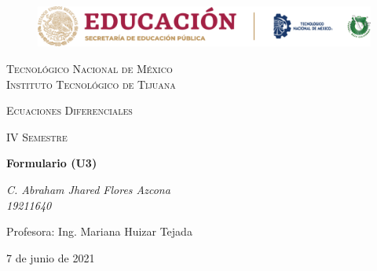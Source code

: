 \documentclass[letterpaper, 12pt]{article}
\begin{document}
    
    \begin{titlepage}
        \begin{figure}[ht]
            \centering
            \includegraphics[width=15cm]{logosITT.png}
        \end{figure}
        \centering
        {\scshape\LARGE Tecnológico Nacional de México\\Instituto Tecnológico de Tijuana\par}
        \vspace{1cm}
        {\scshape\Large Ecuaciones Diferenciales\par}
        \vspace{1cm}
        {\scshape\Large IV Semestre\par}
        \vspace{1.5cm}
        {\huge\bfseries Formulario (U3)\par}
        \vspace{2cm}
        {\Large\itshape C. Abraham Jhared Flores Azcona\\19211640\par}
        \vfill
        Profesora: Ing. Mariana Huizar Tejada\par
        
        \vfill

        {\large 7 de junio de 2021}
    \end{titlepage}
\end{document}
